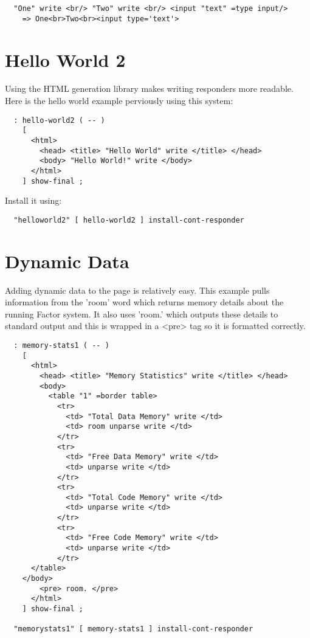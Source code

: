 \begin{verbatim}
  "One" write <br/> "Two" write <br/> <input "text" =type input/>
    => One<br>Two<br><input type='text'>
\end{verbatim}

\section{Hello World 2}


Using the HTML generation library makes writing responders more
readable. Here is the hello world example perviously using this
system:

\begin{verbatim}
  : hello-world2 ( -- )
    [
      <html>
        <head> <title> "Hello World" write </title> </head>
        <body> "Hello World!" write </body>
      </html>
    ] show-final ;
\end{verbatim}

Install it using:

\begin{verbatim}
  "helloworld2" [ hello-world2 ] install-cont-responder
\end{verbatim}

\section{Dynamic Data}

Adding dynamic data to the page is relatively easy. This example pulls
information from the 'room' word which returns memory details about
the running Factor system. It also uses 'room.' which outputs these
details to standard output and this is wrapped in a <pre> tag so it is
formatted correctly.

\begin{verbatim}
  : memory-stats1 ( -- )
    [
      <html>
        <head> <title> "Memory Statistics" write </title> </head>
        <body>
          <table "1" =border table>
            <tr> 
              <td> "Total Data Memory" write </td>
              <td> room unparse write </td>
            </tr>
            <tr> 
              <td> "Free Data Memory" write </td>
              <td> unparse write </td>
            </tr>
            <tr> 
              <td> "Total Code Memory" write </td>
              <td> unparse write </td>
            </tr>
            <tr> 
              <td> "Free Code Memory" write </td>
              <td> unparse write </td>
            </tr>
	  </table>
	</body>
        <pre> room. </pre>
      </html>
    ] show-final ;
    
  "memorystats1" [ memory-stats1 ] install-cont-responder
\end{verbatim}

